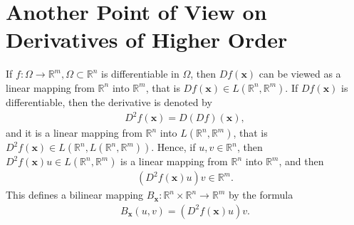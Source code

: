 \documentclass[11pt]{book}
\theoremstyle{definition}
\numberwithin{equation}{chapter}
\begin{document}
\medskip



\section{Another Point of View on Derivatives of Higher Order}

If $f: \Omega \to \mathbb{R}^m, \Omega \subset \mathbb{R}^n$ is differentiable in $\Omega$, then $Df(\mathbf{x})$ can be viewed as a linear mapping from $\mathbb{R}^n$ into $\mathbb{R}^m$, that is $Df(\mathbf{x}) \in L(\mathbb{R}^n, \mathbb{R}^m)$. If $Df(\mathbf{x})$ is differentiable, then the derivative is denoted by 
\begin{align*}
    D^2f(\mathbf{x}) = D(Df)(\mathbf{x}),
\end{align*}
and it is a linear mapping from $\mathbb{R}^n$ into $L(\mathbb{R}^n, \mathbb{R}^m)$, that is $D^2f(\mathbf{x}) \in L(\mathbb{R}^n, L(\mathbb{R}^n, \mathbb{R}^m))$. Hence, if $u, v \in \mathbb{R}^n$, then $D^2f(\mathbf{x})u \in L(\mathbb{R}^n, \mathbb{R}^m)$ is a linear mapping from $\mathbb{R}^n$ into $\mathbb{R}^m$, and then
\begin{align*}
    \left(D^2f(\mathbf{x})u\right)v \in \mathbb{R}^m.
\end{align*}
This defines a bilinear mapping $B_{\mathbf{x}}: \mathbb{R}^n \times \mathbb{R}^n \to \mathbb{R}^m$ by the formula
\begin{align*}
    B_{\mathbf{x}}(u,v) = \left(D^2f(\mathbf{x})u\right)v.
\end{align*}

\medskip
\end{document}
